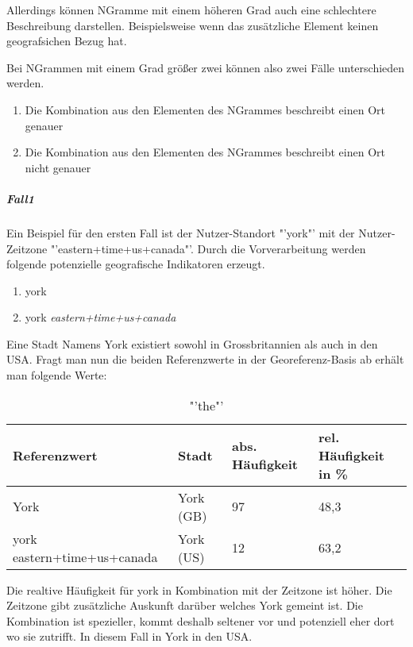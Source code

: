 					Allerdings können NGramme mit einem höheren Grad auch eine schlechtere Beschreibung darstellen. 
					Beispielsweise wenn das zusätzliche Element keinen geografsichen Bezug hat.

					Bei NGrammen mit einem Grad größer zwei können also zwei Fälle unterschieden werden.

					\begin{enumerate}
						\item Die Kombination aus den Elementen des NGrammes beschreibt einen Ort genauer
						\item Die Kombination aus den Elementen des NGrammes beschreibt einen Ort nicht genauer
					\end{enumerate}

					\subparagraph{Fall1} 

						Ein Beispiel für den ersten Fall ist der Nutzer-Standort "'york"' mit der Nutzer-Zeitzone "'eastern+time+us+canada"'. 
						Durch die Vorverarbeitung werden folgende potenzielle geografische Indikatoren erzeugt.
						\begin{enumerate}		
							\item york
							\item york \textit{eastern+time+us+canada}
						\end{enumerate}		

						Eine Stadt Namens York existiert sowohl in Grossbritannien als auch in den USA.
						Fragt man nun die beiden Referenzwerte in der Georeferenz-Basis ab erhält man folgende Werte:

							\begin{table}[h]
								\centering
									\caption{"'the"'}
									\label{tab:the}
									\begin{tabular}{|l|l|l|l|}
									\hline
									Referenzwert 				& Stadt  	& abs. Häufigkeit & rel. Häufigkeit in \% \\ \hline \hline
									York          				& York (GB) & 97              & 48,3       \\ \hline
									york eastern+time+us+canada & York (US) & 12              & 63,2        \\ \hline
									\end{tabular}
							\end{table}

							Die realtive Häufigkeit für york in Kombination mit der Zeitzone ist höher. 
							Die Zeitzone gibt zusätzliche Auskunft darüber welches York gemeint ist. 
							Die Kombination ist spezieller, kommt deshalb seltener vor und potenziell eher dort wo sie zutrifft. 
							In diesem Fall in York in den USA. 

